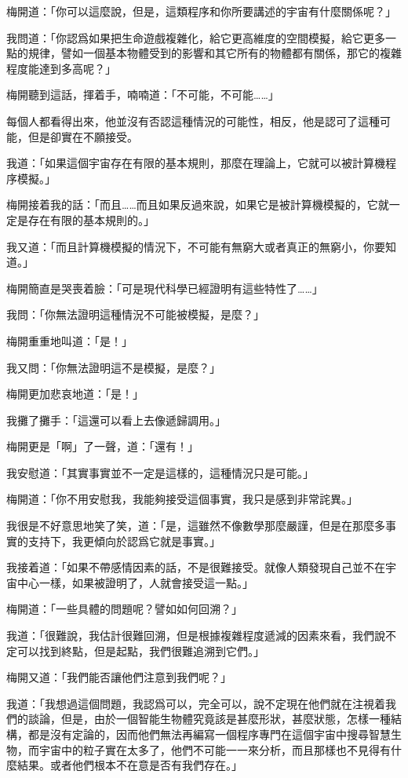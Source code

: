 梅開道：「你可以這麼說，但是，這類程序和你所要講述的宇宙有什麼關係呢？」

我問道：「你認爲如果把生命遊戲複雜化，給它更高維度的空間模擬，給它更多一點的規律，譬如一個基本物體受到的影響和其它所有的物體都有關係，那它的複雜程度能達到多高呢？」


梅開聽到這話，揮着手，喃喃道：「不可能，不可能……」

每個人都看得出來，他並沒有否認這種情況的可能性，相反，他是認可了這種可能，但是卻實在不願接受。

我道：「如果這個宇宙存在有限的基本規則，那麼在理論上，它就可以被計算機程序模擬。」

梅開接着我的話：「而且……而且如果反過來說，如果它是被計算機模擬的，它就一定是存在有限的基本規則的。」

我又道：「而且計算機模擬的情況下，不可能有無窮大或者真正的無窮小，你要知道。」

梅開簡直是哭喪着臉：「可是現代科學已經證明有這些特性了……」

我問：「你無法證明這種情況不可能被模擬，是麼？」

梅開重重地叫道：「是！」

我又問：「你無法證明這不是模擬，是麼？」

梅開更加悲哀地道：「是！」

我攤了攤手：「這還可以看上去像遞歸調用。」

梅開更是「啊」了一聲，道：「還有！」

我安慰道：「其實事實並不一定是這樣的，這種情況只是可能。」

梅開道：「你不用安慰我，我能夠接受這個事實，我只是感到非常詫異。」

我很是不好意思地笑了笑，道：「是，這雖然不像數學那麼嚴謹，但是在那麼多事實的支持下，我更傾向於認爲它就是事實。」

我接着道：「如果不帶感情因素的話，不是很難接受。就像人類發現自己並不在宇宙中心一樣，如果被證明了，人就會接受這一點。」

梅開道：「一些具體的問題呢？譬如如何回溯？」

我道：「很難說，我估計很難回溯，但是根據複雜程度遞減的因素來看，我們說不定可以找到終點，但是起點，我們很難追溯到它們。」

梅開又道：「我們能否讓他們注意到我們呢？」

我道：「我想過這個問題，我認爲可以，完全可以，說不定現在他們就在注視着我們的談論，但是，由於一個智能生物體究竟該是甚麼形狀，甚麼狀態，怎樣一種結構，都是沒有定論的，因而他們無法再編寫一個程序專門在這個宇宙中搜尋智慧生物，而宇宙中的粒子實在太多了，他們不可能一一來分析，而且那樣也不見得有什麼結果。或者他們根本不在意是否有我們存在。」

